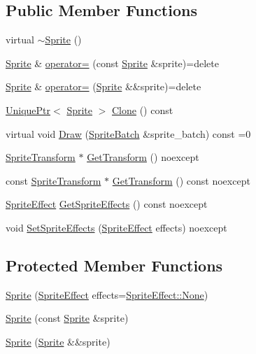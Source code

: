 \subsection*{Public Member Functions}
\begin{DoxyCompactItemize}
\item 
virtual \hyperlink{classmage_1_1_sprite_a0f184574f9c035d6fbb239c1868aa670}{$\sim$\+Sprite} ()
\item 
\hyperlink{classmage_1_1_sprite}{Sprite} \& \hyperlink{classmage_1_1_sprite_aa24dfc716d8b79cc16b4c27409f8cc6b}{operator=} (const \hyperlink{classmage_1_1_sprite}{Sprite} \&sprite)=delete
\item 
\hyperlink{classmage_1_1_sprite}{Sprite} \& \hyperlink{classmage_1_1_sprite_a808d87aeb6d652f9a53e967a75a1eede}{operator=} (\hyperlink{classmage_1_1_sprite}{Sprite} \&\&sprite)=delete
\item 
\hyperlink{namespacemage_a3316d7143a973e37adf1110f2e80ca31}{Unique\+Ptr}$<$ \hyperlink{classmage_1_1_sprite}{Sprite} $>$ \hyperlink{classmage_1_1_sprite_a66e27a8a98ac5a4289e8440ef8193718}{Clone} () const
\item 
virtual void \hyperlink{classmage_1_1_sprite_a954a9f2046edcd6b1658a236ae23ec5a}{Draw} (\hyperlink{classmage_1_1_sprite_batch}{Sprite\+Batch} \&sprite\+\_\+batch) const =0
\item 
\hyperlink{structmage_1_1_sprite_transform}{Sprite\+Transform} $\ast$ \hyperlink{classmage_1_1_sprite_aa28e031e38c51619b3bd7853d212ae06}{Get\+Transform} () noexcept
\item 
const \hyperlink{structmage_1_1_sprite_transform}{Sprite\+Transform} $\ast$ \hyperlink{classmage_1_1_sprite_a8e2c0ae634492efacc92aab2e18e701c}{Get\+Transform} () const noexcept
\item 
\hyperlink{namespacemage_a9cfe18123066ba4236f548f9de75d881}{Sprite\+Effect} \hyperlink{classmage_1_1_sprite_a1a969b7cf3f1892894710a80582b4cd2}{Get\+Sprite\+Effects} () const noexcept
\item 
void \hyperlink{classmage_1_1_sprite_abeefc8ed41e55924be83ba7b480aa40e}{Set\+Sprite\+Effects} (\hyperlink{namespacemage_a9cfe18123066ba4236f548f9de75d881}{Sprite\+Effect} effects) noexcept
\end{DoxyCompactItemize}
\subsection*{Protected Member Functions}
\begin{DoxyCompactItemize}
\item 
\hyperlink{classmage_1_1_sprite_a4e7926b7fd1455afcb95e45f25b83246}{Sprite} (\hyperlink{namespacemage_a9cfe18123066ba4236f548f9de75d881}{Sprite\+Effect} effects=\hyperlink{namespacemage_a5e7e18b0154373ce8fc942fe3f6b27fda6adf97f83acf6453d4a6a4b1070f3754}{Sprite\+Effect\+::\+None})
\item 
\hyperlink{classmage_1_1_sprite_a9c1eb4f5a85e1fa17479012dd22114a9}{Sprite} (const \hyperlink{classmage_1_1_sprite}{Sprite} \&sprite)
\item 
\hyperlink{classmage_1_1_sprite_a84d01e440d0a8105d45a3e18a0698d07}{Sprite} (\hyperlink{classmage_1_1_sprite}{Sprite} \&\&sprite)
\end{DoxyCompactItemize}
